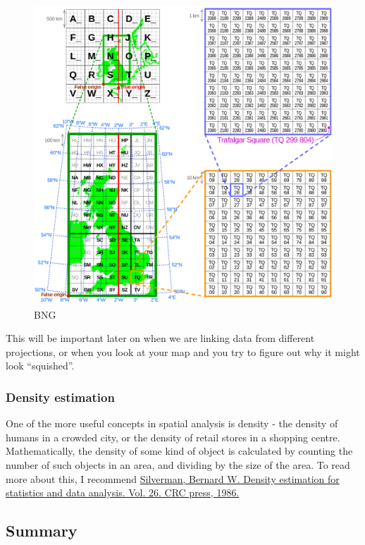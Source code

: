\documentclass[
]{book}
\begin{document}
\begin{figure}
\centering
\includegraphics{img/Ordnance_Survey_National_Grid.svg.png}
\caption{BNG}
\end{figure}

This will be important later on when we are linking data from different projections, or when you look at your map and you try to figure out why it might look ``squished''.

\hypertarget{density-estimation}{%
\subsubsection{Density estimation}\label{density-estimation}}

One of the more useful concepts in spatial analysis is density - the density of humans in a crowded city, or the density of retail stores in a shopping centre. Mathematically, the density of some kind of object is calculated by counting the number of such objects in an area, and dividing by the size of the area. To read more about this, I recommend \href{https://books.google.co.uk/books?id=e-xsrjsL7WkC\&dq=silverman+density+estimation+for+statistics\&lr=\&source=gbs_navlinks_s}{Silverman, Bernard W. Density estimation for statistics and data analysis. Vol. 26. CRC press, 1986.}

\hypertarget{summary}{%
\subsection{Summary}\label{summary}}
\end{document}
